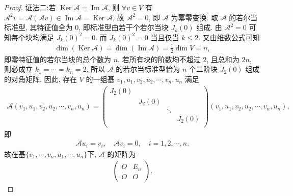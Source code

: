 \documentclass[../../main.tex]{subfiles}%
\begin{document}
\begin{proof}
{\color{blue}证法二:}若 \(\operatorname{Ker} \mathscr{A} = \operatorname{Im} \mathscr{A}\), 则 \(\forall v \in V\) 有 \(\mathscr{A}^2 v = \mathscr{A}(\mathscr{A} v) \in \operatorname{Im} \mathscr{A} = \operatorname{Ker} \mathscr{A}\), 故 \(\mathscr{A}^2 = 0\), 即 \(\mathscr{A}\) 为幂零变换.
取 \(\mathscr{A}\) 的若尔当标准型, 其特征值全为 \(0\), 即标准型由若干个若尔当块 \(J_{k}(0)\) 组成. 由 \(\mathscr{A}^2 = 0\) 可知每个块均满足 \(J_{k}(0)^2 = 0\). 而 \(J_{k}(0)^2 = 0\) 当且仅当 \(k \leqslant 2\).
又由维数公式可知
\begin{align*}
\dim(\operatorname{Ker} \mathscr{A}) =\dim(\operatorname{Im} \mathscr{A})= \frac{1}{2} \dim V = n,
\end{align*}
即零特征值的若尔当块的总个数为 \(n\). 若所有块的阶数均不超过 \(2\), 且总和为 \(2n\), 则必成立 \(k_1 = \cdots = k_n = 2\), 所以 \(\mathscr{A}\) 的若尔当标准型恰为 \(n\) 个二阶块 \(J_2(0)\) 组成的对角矩阵.
因此, 存在 \(V\) 的一组基 \(v_1,u_1,v_2, u_2, \cdots, v_n,u_n\) 满足 
\begin{align*}
\mathscr{A} \left( v_1,u_1,v_2,u_2,\cdots ,v_n,u_n \right) =\left( \begin{matrix}
J_2\left( 0 \right)&		&		&		\\
&		J_2\left( 0 \right)&		&		\\
&		&		\ddots&		\\
&		&		&		J_2\left( 0 \right)\\
\end{matrix} \right) \left( v_1,u_1,v_2,u_2,\cdots ,v_n,u_n \right) ,
\end{align*}
即
\begin{align*}
\mathscr{A} u_i=v_i,\quad \mathscr{A} v_i=0,\quad i=1,2,\cdots ,n.
\end{align*}
故在基$\{v_1, \cdots, v_n, u_1, \cdots, u_n\}$下, \(\mathscr{A}\) 的矩阵为
\begin{align*}
\begin{pmatrix}
O & E_n \\
O & O
\end{pmatrix}.
\end{align*}
\end{proof}
\end{document}
